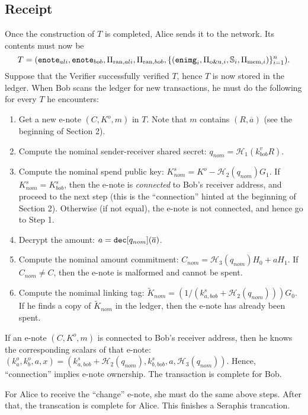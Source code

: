 \documentclass{article}
\begin{document}
\subsection{Receipt}
Once the construction of $T$ is completed, Alice sends it to the network. Its contents must now be
$$T=({\tt enote}_{ali}, {\tt enote}_{bob}, \Pi_{\text{ran}, ali}, \Pi_{\text{ran}, bob}, \{({\tt enimg}_i, \Pi_{\text{o\&u}, i}, \mathbb{S}_i, \Pi_{\text{mem}, i})\}_{i=1}^n).$$
\noindent Suppose that the Verifier successfully verified $T$, hence $T$ is now stored in the ledger. When Bob scans the ledger for new transactions, he must do the following for every $T$ he encounters:
\begin{enumerate}
    \item Get a new e-note $(C, K^o, m)$ in $T$. Note that $m$ contains $(R, \overline{a})$ (see the beginning of Section 2).
    \item Compute the nominal sender-receiver shared secret: $q_{nom} = \mathcal{H}_1(k_{bob}^v R)$.
    \item Compute the nominal spend public key: $K_{nom}^s = K^o - \mathcal{H}_2(q_{nom})G_1$. If $K_{nom}^s = K_{bob}^s$, then the e-note is \textit{connected} to Bob's receiver address, and proceed to the next step (this is the ``connection'' hinted at the beginning of Section 2).  Otherwise (if not equal), the e-note is not connected, and hence go to Step 1.
    \item Decrypt the amount: $a = {\tt dec}[q_{nom}](\overline a)$.
    \item Compute the nominal amount commitment: $C_{nom} = \mathcal{H}_3(q_{nom})H_0 + a H_1$. If $C_{nom} \ne C$, then the e-note is malformed and cannot be spent.
    \item Compute the nomimal linking tag: $\tilde{K}_{nom} = (1/(k_{a, bob}^s + \mathcal{H}_2(q_{nom})))G_0$. If he finds a copy of $\tilde{K}_{nom}$ in the ledger, then the e-note has already been spent.
\end{enumerate}
If an e-note $(C, K^o, m)$ is connected to Bob's receiver address, then he knows the corresponding scalars of that e-note: $(k_a^o, k_b^o, a, x) = (k_{a, bob}^s + \mathcal{H}_2(q_{nom}), k_{b, bob}^s, a, \mathcal{H}_3(q_{nom}))$. Hence, ``connection'' implies e-note ownership. The transaction is complete for Bob.

For Alice to receive the ``change'' e-note, she must do the same above steps. After that, the transcation is complete for Alice. This finishes a Seraphis trancation.
\end{document}
